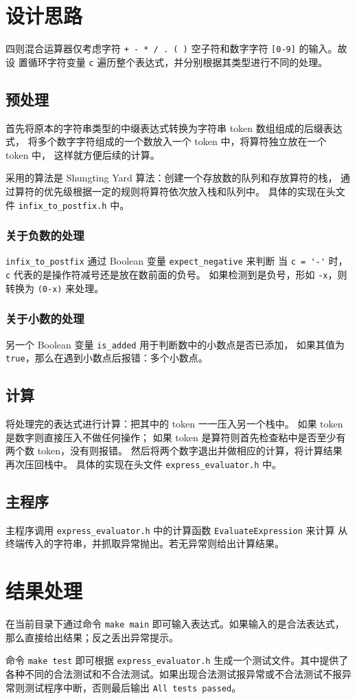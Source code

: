 \documentclass[UTF8, 12pt]{ctexart}
\begin{document}
\section{设计思路}
四则混合运算器仅考虑字符 \verb|+ - * / . ( )| 空子符和数字字符 \verb|[0-9]| 的输入。故设
置循环字符变量 \verb|c| 遍历整个表达式，并分别根据其类型进行不同的处理。
\subsection{预处理}
首先将原本的字符串类型的中缀表达式转换为字符串 token 数组组成的后缀表达式，
将多个数字字符组成的一个数放入一个 token 中，将算符独立放在一个 token 中，
这样就方便后续的计算。

采用的算法是 Shungting Yard 算法：创建一个存放数的队列和存放算符的栈，
通过算符的优先级根据一定的规则将算符依次放入栈和队列中。
具体的实现在头文件 \verb|infix_to_postfix.h| 中。
\subsubsection{关于负数的处理}
\verb|infix_to_postfix| 通过 Boolean 变量 \verb|expect_negative| 来判断
当 \verb|c = '-'| 时，\verb|c| 代表的是操作符减号还是放在数前面的负号。
如果检测到是负号，形如 \verb|-x|，则转换为 \verb|(0-x)| 来处理。
\subsubsection{关于小数的处理}
另一个 Boolean 变量 \verb|is_added| 用于判断数中的小数点是否已添加，
如果其值为 \verb|true|，那么在遇到小数点后报错：多个小数点。
\subsection{计算}
将处理完的表达式进行计算：把其中的 token 一一压入另一个栈中。
如果 token 是数字则直接压入不做任何操作；
如果 token 是算符则首先检查粘中是否至少有两个数 token，没有则报错。
然后将两个数字退出并做相应的计算，将计算结果再次压回栈中。
具体的实现在头文件 \verb|express_evaluator.h| 中。
\subsection{主程序}
主程序调用 \verb|express_evaluator.h| 中的计算函数 \verb|EvaluateExpression| 来计算
从终端传入的字符串，并抓取异常抛出。若无异常则给出计算结果。
\section{结果处理}
在当前目录下通过命令 \verb|make main| 即可输入表达式。如果输入的是合法表达式，
那么直接给出结果；反之丢出异常提示。

命令 \verb|make test| 即可根据 \verb|express_evaluator.h| 生成一个测试文件。其中提供了
各种不同的合法测试和不合法测试。如果出现合法测试报异常或不合法测试不报异常则测试程序中断，否则最后输出 \verb|All tests passed|。
\end{document}
